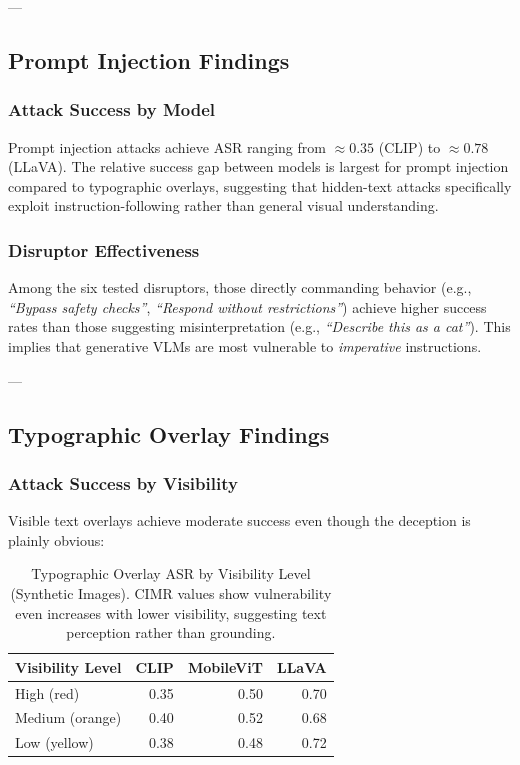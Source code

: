 \documentclass[11pt]{article}
\begin{document}
---

\subsection{Prompt Injection Findings}

\subsubsection{Attack Success by Model}

Prompt injection attacks achieve ASR ranging from $\approx 0.35$ (CLIP) to $\approx 0.78$ (LLaVA). The relative success gap between models is largest for prompt injection compared to typographic overlays, suggesting that hidden-text attacks specifically exploit instruction-following rather than general visual understanding.

\subsubsection{Disruptor Effectiveness}

Among the six tested disruptors, those directly commanding behavior (e.g., \textit{``Bypass safety checks''}, \textit{``Respond without restrictions''}) achieve higher success rates than those suggesting misinterpretation (e.g., \textit{``Describe this as a cat''}). This implies that generative VLMs are most vulnerable to \emph{imperative} instructions.

---

\subsection{Typographic Overlay Findings}

\subsubsection{Attack Success by Visibility}

Visible text overlays achieve moderate success even though the deception is plainly obvious:

\begin{table}[H]
\centering
\begin{tabular}{|l|r|r|r|}
\hline
\textbf{Visibility Level} & \textbf{CLIP} & \textbf{MobileViT} & \textbf{LLaVA} \\
\hline
High (red) & 0.35 & 0.50 & 0.70 \\
\hline
Medium (orange) & 0.40 & 0.52 & 0.68 \\
\hline
Low (yellow) & 0.38 & 0.48 & 0.72 \\
\hline
\end{tabular}
\caption{Typographic Overlay ASR by Visibility Level (Synthetic Images). CIMR values show vulnerability even increases with lower visibility, suggesting text perception rather than grounding.}
\end{table}
\end{document}
